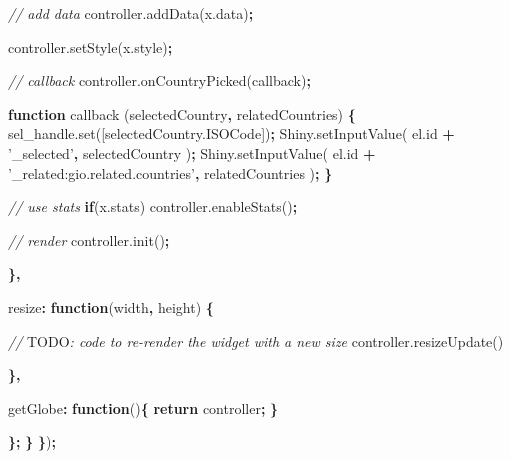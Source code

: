 \documentclass[10pt,]{krantz}
\makeatletter
\newenvironment{Shaded}{\begin{snugshade}}{\end{snugshade}}
\newcommand{\AlertTok}[1]{\textcolor[rgb]{0.33,0.33,0.33}{#1}}
\newcommand{\AttributeTok}[1]{\textcolor[rgb]{0.61,0.61,0.61}{#1}}
\newcommand{\CommentTok}[1]{\textcolor[rgb]{0.37,0.37,0.37}{\textit{#1}}}
\newcommand{\ControlFlowTok}[1]{\textcolor[rgb]{0.27,0.27,0.27}{\textbf{#1}}}
\newcommand{\DataTypeTok}[1]{\textcolor[rgb]{0.27,0.27,0.27}{#1}}
\newcommand{\KeywordTok}[1]{\textcolor[rgb]{0.27,0.27,0.27}{\textbf{#1}}}
\newcommand{\NormalTok}[1]{#1}
\newcommand{\OperatorTok}[1]{\textcolor[rgb]{0.43,0.43,0.43}{\textbf{#1}}}
\newcommand{\StringTok}[1]{\textcolor[rgb]{0.5,0.5,0.5}{#1}}
\newcommand{\VariableTok}[1]{\textcolor[rgb]{0,0,0}{#1}}
\newenvironment{kframe}{%
\medskip{}
\setlength{\fboxsep}{.8em}
 \def\at@end@of@kframe{}%
 \ifinner\ifhmode%
  \def\at@end@of@kframe{\end{minipage}}%
  \begin{minipage}{\columnwidth}%
 \fi\fi%
 \def\FrameCommand##1{\hskip\@totalleftmargin \hskip-\fboxsep
 \colorbox{shadecolor}{##1}\hskip-\fboxsep
     \hskip-\linewidth \hskip-\@totalleftmargin \hskip\columnwidth}%
 \MakeFramed {\advance\hsize-\width
   \@totalleftmargin\z@ \linewidth\hsize
   \@setminipage}}%
 {\par\unskip\endMakeFramed%
 \at@end@of@kframe}
\renewenvironment{Shaded}{\begin{kframe}}{\end{kframe}}
\makeatother
\begin{document}
\begin{Shaded}
\begin{Highlighting}[]
        \CommentTok{// add data}
        \VariableTok{controller}\NormalTok{.}\AttributeTok{addData}\NormalTok{(}\VariableTok{x}\NormalTok{.}\AttributeTok{data}\NormalTok{)}\OperatorTok{;}

        \VariableTok{controller}\NormalTok{.}\AttributeTok{setStyle}\NormalTok{(}\VariableTok{x}\NormalTok{.}\AttributeTok{style}\NormalTok{)}\OperatorTok{;}

        \CommentTok{// callback}
        \VariableTok{controller}\NormalTok{.}\AttributeTok{onCountryPicked}\NormalTok{(callback)}\OperatorTok{;}

        \KeywordTok{function} \AttributeTok{callback}\NormalTok{ (selectedCountry}\OperatorTok{,}\NormalTok{ relatedCountries) }\OperatorTok{\{}
          \VariableTok{sel_handle}\NormalTok{.}\AttributeTok{set}\NormalTok{([}\VariableTok{selectedCountry}\NormalTok{.}\AttributeTok{ISOCode}\NormalTok{])}\OperatorTok{;}
          \VariableTok{Shiny}\NormalTok{.}\AttributeTok{setInputValue}\NormalTok{(}
            \VariableTok{el}\NormalTok{.}\AttributeTok{id} \OperatorTok{+} \StringTok{'_selected'}\OperatorTok{,} 
\NormalTok{            selectedCountry}
\NormalTok{          )}\OperatorTok{;}
          \VariableTok{Shiny}\NormalTok{.}\AttributeTok{setInputValue}\NormalTok{(}
            \VariableTok{el}\NormalTok{.}\AttributeTok{id} \OperatorTok{+} \StringTok{'_related:gio.related.countries'}\OperatorTok{,} 
\NormalTok{            relatedCountries}
\NormalTok{          )}\OperatorTok{;}
        \OperatorTok{\}}

        \CommentTok{// use stats}
        \ControlFlowTok{if}\NormalTok{(}\VariableTok{x}\NormalTok{.}\AttributeTok{stats}\NormalTok{)}
          \VariableTok{controller}\NormalTok{.}\AttributeTok{enableStats}\NormalTok{()}\OperatorTok{;}

        \CommentTok{// render}
        \VariableTok{controller}\NormalTok{.}\AttributeTok{init}\NormalTok{()}\OperatorTok{;}

      \OperatorTok{\},}

      \DataTypeTok{resize}\OperatorTok{:} \KeywordTok{function}\NormalTok{(width}\OperatorTok{,}\NormalTok{ height) }\OperatorTok{\{}

        \CommentTok{// }\AlertTok{TODO}\CommentTok{: code to re-render the widget with a new size}
        \VariableTok{controller}\NormalTok{.}\AttributeTok{resizeUpdate}\NormalTok{()}

      \OperatorTok{\},}

      \DataTypeTok{getGlobe}\OperatorTok{:} \KeywordTok{function}\NormalTok{()}\OperatorTok{\{}
        \ControlFlowTok{return}\NormalTok{ controller}\OperatorTok{;}
      \OperatorTok{\}}

    \OperatorTok{\};}
  \OperatorTok{\}}
\OperatorTok{\}}\NormalTok{)}\OperatorTok{;}
\end{Highlighting}
\end{Shaded}
\end{document}
